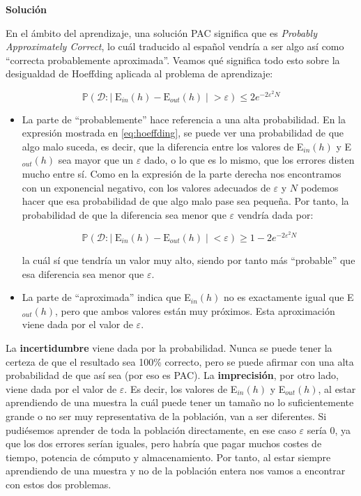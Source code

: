 \documentclass[11pt,a4paper]{article}
\newcommand{\answer}{\noindent\textbf{Solución}}
\newcommand{\ein}{E$_{in}$}
\newcommand{\eout}{E$_{out}$}
\begin{document}
\answer

En el ámbito del aprendizaje, una solución PAC significa que es \textit{Probably Approximately Correct}, 
lo cuál traducido al español vendría a ser algo así como ``correcta probablemente aproximada''.
Veamos qué significa todo esto sobre la desigualdad de Hoeffding aplicada al problema de aprendizaje:

\begin{equation}
\label{eq:hoeffding}
	\mathbb{P}(\mathcal{D}: | \; \text{E}_{in}(h) - \text{E}_{out}(h) \; | \; > \varepsilon) \leq 2e^{-2\varepsilon^2N}
\end{equation}

\begin{itemize}[label=\textbullet]
	\item  La parte de ``probablemente'' hace referencia a una alta probabilidad. En la expresión mostrada en
	\eqref{eq:hoeffding}, se puede ver una probabilidad de que algo malo suceda, es decir, que la
	diferencia 	entre los valores de \ein{}$(h)$ y \eout{}$(h)$ sea mayor que un $\varepsilon$ dado, o lo que es lo mismo,
	que los errores disten mucho entre sí. Como en la 	expresión de la parte derecha nos encontramos con un exponencial
	negativo, con los valores adecuados de $\varepsilon$ y $N$ podemos hacer que esa probabilidad de que algo malo pase sea
	pequeña.
	Por tanto, la probabilidad de que la diferencia sea menor que $\varepsilon$ vendría dada por:
	
	\[\mathbb{P}(\mathcal{D}: | \; \text{E}_{in}(h) - \text{E}_{out}(h) \; | \; < \varepsilon) \geq 1 - 2e^{-2\varepsilon^2N}\]
	
	\noindent la cuál sí que tendría un valor muy alto, siendo por tanto más ``probable'' que esa diferencia sea menor que
	$\varepsilon$.
	\item La parte de ``aproximada'' indica que \ein{}$(h)$ no es exactamente igual que \eout{}$(h)$,
	pero que ambos valores están muy próximos. Esta aproximación viene dada por el valor de $\varepsilon$.
\end{itemize}

La \textbf{incertidumbre} viene dada por la probabilidad. Nunca se puede tener la certeza de que el resultado sea 100\%
correcto, pero se puede afirmar con una alta probabilidad de que así sea (por eso es PAC).
La \textbf{imprecisión}, por otro lado, viene dada por el valor de $\varepsilon$. Es decir, los valores de \ein{}$(h)$ y
\eout{}$(h)$, al estar aprendiendo de una muestra la cuál puede tener un tamaño no lo suficientemente grande o no ser muy
representativa de la población, van a ser diferentes.
Si pudiésemos aprender de toda la población directamente, en ese caso $\varepsilon$ sería 0, ya que los dos errores serían
iguales, pero habría que pagar muchos costes de tiempo, potencia de cómputo y almacenamiento. Por tanto, al estar siempre
aprendiendo de una muestra y no de la población entera nos vamos a encontrar con estos dos problemas.
\end{document}
